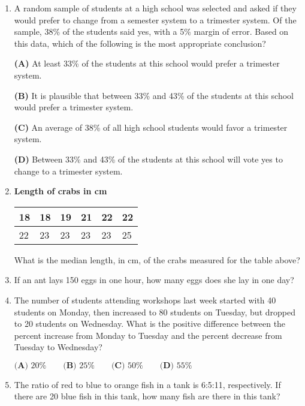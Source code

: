 \documentclass[../satmath.tex]{subfiles}
\begin{document}
\begin{enumerate}[label=\bfseries\arabic*.]
\item A random sample of students at a high school was selected and asked if they would prefer to change from a semester system to a trimester 
system. Of the sample, 38\% of the students said yes, with a 5\% margin of error. Based on this data, which of the following is the most appropriate conclusion?

\textbf{(A) } At least 33\% of the students at this school would prefer a trimester system.

\textbf{(B) } It is plausible that between 33\% and 43\% of the students at this school would prefer a trimester system.

\textbf{(C) } An average of 38\% of all high school students would favor a trimester system.

\textbf{(D) } Between 33\% and 43\% of the students at this school will vote yes to change to a trimester system.
 
\item 

\begin{center}
    \textbf{Length of crabs in cm}
\end{center}
\begin{table}[h]
    \centering
    \begin{tabular}{|l|l|l|l|l|l|}
    \hline
    18 & 18 & 19 & 21 & 22 & 22 \\ \hline
    22 & 23 & 23 & 23 & 23 & 25 \\ \hline
    \end{tabular}
\end{table}
What is the median length, in cm, of the crabs measured for the table above?
 
\item If an ant lays 150 eggs in one hour, how many eggs does she lay in one day?
 
\item The number of students attending workshops last week started with 40 students on Monday, then increased to 80 students on Tuesday, but dropped to 
20 students on Wednesday. What is the positive difference between the percent increase from Monday to Tuesday and the percent decrease from Tuesday to Wednesday?

$\textbf{(A) } 20\% \qquad \textbf{(B) } 25\% \qquad \textbf{(C) } 50\% \qquad \textbf{(D) } 55\%$


\item  The ratio of red to blue to orange fish in a tank is 6:5:11, respectively. If there are 20 blue fish in this tank, how many fish are there in this tank?
 

\end{enumerate}
\end{document}
